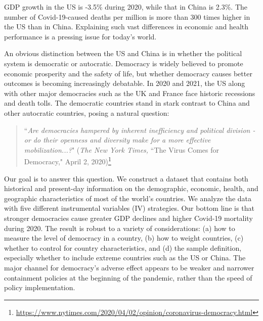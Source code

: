 GDP growth in the US is -3.5\% during 2020, while that in China is 2.3\%. The number of Covid-19-caused deaths per million is more than 300 times higher in the US than in China. Explaining such vast differences in economic and health performance is a pressing issue for today's world.




An obvious distinction between the US and China is in whether the political system is democratic or autocratic. 
Democracy is widely believed to promote economic prosperity and the safety of life, but whether democracy causes better outcomes is becoming increasingly debatable. In 2020 and 2021, the US along with other major democracies such as the UK and France face historic recessions and death tolls. The democratic countries stand in stark contrast to China and other autocratic countries, posing a natural question: 

\begin{quote}
``\textit{Are democracies hampered by inherent inefficiency and political division - or do their openness and diversity make for a more effective mobilization...?}" (\emph{The New York Times,} ``The Virus Comes for Democracy," April 2, 2020)\footnote{\url{https://www.nytimes.com/2020/04/02/opinion/coronavirus-democracy.html}} 
\end{quote}

Our goal is to answer this question. We construct a dataset that contains both historical and present-day information on the demographic, economic, health, and geographic characteristics of most of the world’s countries.
 We analyze the data with five different instrumental variables (IV) strategies. Our bottom line is that stronger democracies cause greater GDP declines and higher Covid-19 mortality during 2020. The result is robust to a variety of considerations: (a) how to measure the level of democracy in a country, (b) how to weight countries, (c) whether to control for country characteristics, and (d) the sample definition, especially whether to include extreme countries such as the US or China. The major channel for democracy's adverse effect appears to be weaker and narrower containment policies at the beginning of the pandemic, rather than the speed of policy implementation. 

